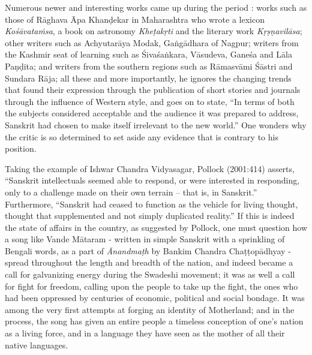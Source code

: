 Numerous newer and interesting works came up during the period : works such as those of Rāghava Āpa Khanḍekar in Maharashtra who wrote  a lexicon {\sl Kośāvataṁsa}, a book on astronomy {\sl Kheṭakṛti} and the literary work {\sl Kṛṣṇavilāsa}; other writers such as Achyutarāya Modak, Gaṅgādhara of Nagpur; writers from the Kashmir seat of learning such as Śivaśaṅkara, Vāsudeva, Ganeśa and Lāla Paṇḍita; and writers from the southern regions such as Rāmasvāmi Śāstri and  Sundara Rāja; all these and more importantly, he ignores the changing trends that found their expression through the publication of short stories and journals through the influence of Western style, and goes on to state, “In terms of both the subjects considered acceptable and the audience it was prepared to address, Sanskrit had chosen to make itself irrelevant to the new world.” One wonders why the critic is so determined to set aside any evidence that is contrary to his position.

Taking the example of Ishwar Chandra Vidyasagar, Pollock (2001:414) asserts, “Sanskrit intellectuals seemed able to respond, or were interested in responding, only to a challenge made on their own terrain – that is, in Sanskrit.” Furthermore, “Sanskrit had ceased to function as the vehicle for living thought, thought that supplemented and not simply duplicated reality.” If this is indeed the state of affairs in the country, as suggested by Pollock, one must question how a song like Vande Mātaram - written in simple Sanskrit with a sprinkling of Bengali words, as a part of {\sl Ānandmaṭh} by Bankim Chandra Chaṭṭopādhyay - spread throughout the length and breadth of the nation, and indeed became a call for galvanizing energy during the Swadeshi movement; it was as well a call for fight for freedom, calling upon the people to take up the fight, the ones who had been oppressed by centuries of economic, political and social bondage. It was among the very first attempts at forging an identity of Motherland; and in the process, the song has given an entire people a timeless conception of one’s nation as a living force, and in a language they have seen as the mother of all their native languages. 


